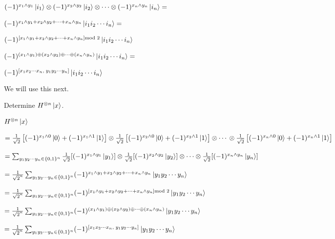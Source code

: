 $(-1)^{x_1 \wedge y_1}\left|i_1\right\rangle \otimes
(-1)^{x_2 \wedge y_2}\left|i_2\right\rangle \otimes
\dotsm \otimes
(-1)^{x_n \wedge y_n}\left|i_n\right\rangle = $ 

$(-1)^{x_1 \wedge y_1 + x_2 \wedge y_2 + \dotsm + x_n \wedge y_n}\left|i_1 i_2 \dotsm i_n\right\rangle = $

$(-1)^{[x_1 \wedge y_1 + x_2 \wedge y_2 + \dotsm + x_n \wedge y_n] \text{mod } 2}\left|i_1 i_2 \dotsm i_n\right\rangle$

$(-1)^{(x_1 \wedge y_1) \oplus (x_2 \wedge y_2) \oplus \dotsm \oplus (x_n \wedge y_n)}
\left|i_1 i_2 \dotsm i_n\right\rangle =$

$(-1)^{[x_1 x_2 \dotsm x_n, \; y_1 y_2 \dotsm y_n]}
\left|i_1 i_2 \dotsm i_n\right\rangle$

We will use this next.

\frmrule


\begin{example}
Determine $H^{\otimes n}\left|x\right\rangle$.
\end{example}


$H^{\otimes n}\left|x\right\rangle$

$= 
\frac{1}{\sqrt{2}} \left[(-1)^{x_1 \wedge 0} \left|0\right\rangle + (-1)^{x_1 \wedge 1} \left|1\right\rangle \right] \otimes
\frac{1}{\sqrt{2}} \left[(-1)^{x_2 \wedge 0} \left|0\right\rangle + (-1)^{x_2 \wedge 1} \left|1\right\rangle \right] \otimes
\dotsm 
\\ \otimes \frac{1}{\sqrt{2}} \left[(-1)^{x_n \wedge 0} \left|0\right\rangle + (-1)^{x_n \wedge 1} \left|1\right\rangle \right]
$

$= \sum_{y_1 y_2 \dotsm y_n \in \{0,1\}^n}
\frac{1}{\sqrt{2}} [(-1)^{x_1 \wedge y_1}\left|y_1\right\rangle] \otimes \frac{1}{\sqrt{2}} [(-1)^{x_2 \wedge y_2}\left|y_2\right\rangle] 
\otimes \dotsm \otimes \frac{1}{\sqrt{2}} [(-1)^{x_n \wedge y_n}\left|y_n\right\rangle]
$

$= 
\frac{1}{\sqrt{2}^n} \sum_{y_1 y_2 \dotsm y_n \in \{0,1\}^n}
(-1)^{x_1 \wedge y_1 + x_2 \wedge y_2 + \dotsm + x_n \wedge y_n} \left|y_1 y_2 \dotsm y_n\right\rangle
$

$= 
\frac{1}{\sqrt{2}^n} \sum_{y_1 y_2 \dotsm y_n \in \{0,1\}^n}
(-1)^{[x_1 \wedge y_1 + x_2 \wedge y_2 + \dotsm + x_n \wedge y_n] \text{mod } 2 } \left|y_1 y_2 \dotsm y_n\right\rangle
$

$= 
\frac{1}{\sqrt{2}^n} \sum_{y_1 y_2 \dotsm y_n \in \{0,1\}^n}
(-1)^{(x_1 \wedge y_1) \oplus (x_2 \wedge y_2) \oplus \dotsm \oplus (x_n \wedge y_n)} \left|y_1 y_2 \dotsm y_n\right\rangle
$

$= 
\frac{1}{\sqrt{2}^n} \sum_{y_1 y_2 \dotsm y_n \in \{0,1\}^n}
(-1)^{[x_1 x_2 \dotsm x_n, \; y_1 y_2 \dotsm y_n]} \left|y_1 y_2 \dotsm y_n\right\rangle
$



